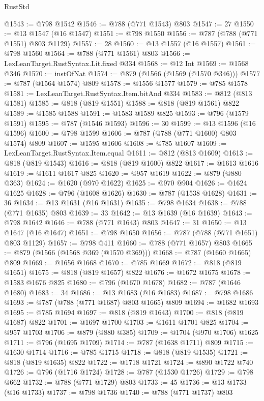 \begin{lexlean}{RustStd}
\begin{coremodule}
@1543 := @798 @1542
@1546 := @788 (@771 @1543) @803
@1547 := 27
@1550 := @13 @1547 (@16 @1547)
@1551 := @798 @1550
@1556 := @787 (@788 (@771 @1551) @803 @1129)
@1557 := 28
@1560 := @13 @1557 (@16 @1557)
@1561 := @798 @1560
@1564 := @788 (@771 @1561) @803
@1566 := LexLeanTarget.RustSyntax.Lit.fixed @334
@1568 := @12 Int
@1569 := @1568 @346
@1570 := instOfNat
@1574 := @879 (@1566 (@1569 (@1570 @346)))
@1577 := @787 (@1564 @1574) @809
@1578 := @1556 @1577
@1579 := @785 @1578
@1581 := LexLeanTarget.RustSyntax.Item.bitAnd @334
@1583 := @812 (@813 @1581)
@1585 := @818 (@819 @1551)
@1588 := @818 (@819 @1561) @822
@1589 := @1585 @1588
@1591 := @1583 @1589 @825
@1593 := @796 (@1579 @1591)
@1595 := @787 (@1546 @1593)
@1596 := 30
@1599 := @13 @1596 (@16 @1596)
@1600 := @798 @1599
@1606 := @787 (@788 (@771 @1600) @803 @1574) @809
@1607 := @1595 @1606
@1608 := @785 @1607
@1609 := LexLeanTarget.RustSyntax.Item.equal
@1611 := @812 (@813 @1609)
@1613 := @818 (@819 @1543)
@1616 := @818 (@819 @1600) @822
@1617 := @1613 @1616
@1619 := @1611 @1617 @825
@1620 := @957 @1619
@1622 := @879 (@880 @363)
@1624 := @1620 (@970 @1622)
@1625 := @970 @904
@1626 := @1624 @1625
@1628 := @796 (@1608 @1626)
@1630 := @787 (@1538 @1628)
@1631 := 36
@1634 := @13 @1631 (@16 @1631)
@1635 := @798 @1634
@1638 := @788 (@771 @1635) @803
@1639 := 33
@1642 := @13 @1639 (@16 @1639)
@1643 := @798 @1642
@1646 := @788 (@771 @1643) @803
@1647 := 31
@1650 := @13 @1647 (@16 @1647)
@1651 := @798 @1650
@1656 := @787 (@788 (@771 @1651) @803 @1129)
@1657 := @798 @411
@1660 := @788 (@771 @1657) @803
@1665 := @879 (@1566 (@1568 @369 (@1570 @369)))
@1668 := @787 (@1660 @1665) @809
@1669 := @1656 @1668
@1670 := @785 @1669
@1672 := @818 (@819 @1651)
@1675 := @818 (@819 @1657) @822
@1676 := @1672 @1675
@1678 := @1583 @1676 @825
@1680 := @796 (@1670 @1678)
@1682 := @787 (@1646 @1680)
@1683 := 34
@1686 := @13 @1683 (@16 @1683)
@1687 := @798 @1686
@1693 := @787 (@788 (@771 @1687) @803 @1665) @809
@1694 := @1682 @1693
@1695 := @785 @1694
@1697 := @818 (@819 @1643)
@1700 := @818 (@819 @1687) @822
@1701 := @1697 @1700
@1703 := @1611 @1701 @825
@1704 := @957 @1703
@1706 := @879 (@880 @385)
@1709 := @1704 (@970 @1706) @1625
@1711 := @796 (@1695 @1709)
@1714 := @787 (@1638 @1711) @809
@1715 := @1630 @1714
@1716 := @785 @1715
@1718 := @818 (@819 @1535)
@1721 := @818 (@819 @1635) @822
@1722 := @1718 @1721
@1724 := @890 @1722 @740
@1726 := @796 (@1716 @1724)
@1728 := @787 (@1530 @1726)
@1729 := @798 @662
@1732 := @788 (@771 @1729) @803
@1733 := 45
@1736 := @13 @1733 (@16 @1733)
@1737 := @798 @1736
@1740 := @788 (@771 @1737) @803

\end{coremodule}
\end{lexlean}
